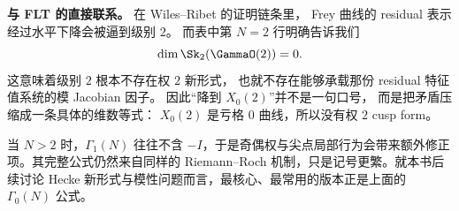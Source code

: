 \textbf{与 FLT 的直接联系。}
在 Wiles--Ribet 的证明链条里，
Frey 曲线的 residual 表示经过水平下降会被逼到级别 $2$。
而表中第 $N=2$ 行明确告诉我们
\[
  \dim \Sk_2(\GammaO(2))=0.
\]
这意味着级别 $2$ 根本不存在权 $2$ 新形式，
也就不存在能够承载那份 residual 特征值系统的模 Jacobian 因子。
因此“降到 $X_0(2)$”并不是一句口号，
而是把矛盾压缩成一条具体的维数等式：
$X_0(2)$ 是亏格 $0$ 曲线，所以没有权 $2$ cusp form。

\begin{remark}[关于 $\Gamma_1(N)$]
当 $N>2$ 时，$\Gamma_1(N)$ 往往不含 $-I$，于是奇偶权与尖点局部行为会带来额外修正项。其完整公式仍然来自同样的 Riemann--Roch 机制，只是记号更繁。就本书后续讨论 Hecke 新形式与模性问题而言，最核心、最常用的版本正是上面的 $\Gamma_0(N)$ 公式。
\end{remark}
